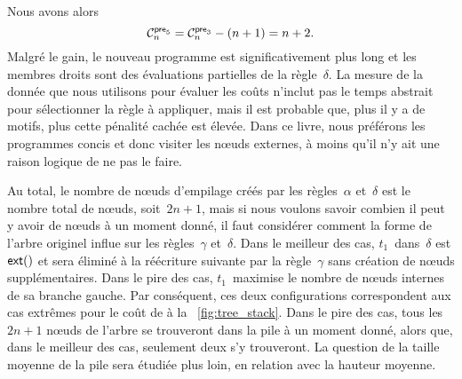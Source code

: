 Nous avons alors
\begin{equation*}
\C{\fun{pre}_5}{n} = \C{\fun{pre}_3}{n} - (n+1) = n + 2.
\end{equation*}
Malgré le gain, le nouveau programme est significativement plus long
et les membres droits sont des évaluations partielles de la règle~\(\delta\). La
mesure de la donnée que nous utilisons pour évaluer les coûts n'inclut
pas le temps abstrait pour sélectionner la règle à appliquer, mais il
est probable que, plus il y a de motifs, plus cette pénalité cachée
est élevée. Dans ce livre, nous préférons les programmes concis et
donc visiter les nœuds externes, à moins qu'il n'y ait une raison
logique de ne pas le faire.

Au total, le nombre de nœuds d'empilage
créés par les règles~\(\alpha\) et~\(\delta\) est le nombre total de
nœuds, soit~\(2n+1\), mais si nous voulons savoir combien il peut
y avoir de nœuds à un moment donné, il faut considérer comment la
forme de l'arbre originel influe sur les règles~\(\gamma\)
et~\(\delta\). Dans le meilleur des cas, \(t_1\)~dans~\(\delta\) est
\(\fun{ext}()\) et sera éliminé à la réécriture suivante par la
règle~\(\gamma\) sans création de nœuds supplémentaires. Dans le
pire des cas, \(t_1\)~maximise le nombre de nœuds internes de sa
branche gauche. Par conséquent, ces deux configurations correspondent
aux cas extrêmes pour le coût de
 à la
\fig~\vref{fig:tree_stack}. Dans le pire des cas, tous les \(2n+1\)
nœuds de l'arbre se trouveront dans la pile à un moment donné,
alors que, dans le meilleur des cas, seulement deux s'y trouveront. La
question de la taille moyenne de la pile sera étudiée plus loin, en
relation avec la hauteur moyenne.

